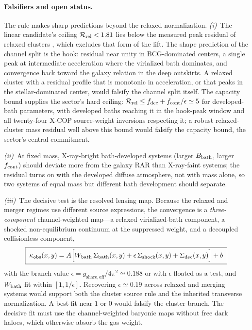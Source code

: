 \documentclass[11pt]{article}
\begin{document}
\paragraph{Falsifiers and open status.}
The rule makes sharp predictions beyond the relaxed normalization. \emph{(i)}~The linear candidate's ceiling $\mathcal R_{\rm rel}<1.81$ lies below the measured peak residual of relaxed clusters \citep{Tian2020,Eckert2022}, which excludes that form of the lift. The shape prediction of the channel split is the hook: residual near unity in BCG-dominated centers, a single peak at intermediate acceleration where the virialized bath dominates, and convergence back toward the galaxy relation in the deep outskirts. A relaxed cluster with a residual profile that is monotonic in acceleration, or that peaks in the stellar-dominated center, would falsify the channel split itself. The capacity bound supplies the sector's hard ceiling: $\mathcal R_{\rm rel}\le f_{\rm dec}+f_{\rm cont}/\epsilon\simeq5$ for developed-bath parameters, with developed baths reaching it in the hook-peak window and all twenty-four X-COP source-weight inversions respecting it; a robust relaxed-cluster mass residual well above this bound would falsify the capacity bound, the sector's central commitment.

\emph{(ii)}~At fixed mass, X-ray-bright bath-developed systems (larger $B_{\rm bath}$, larger $f_{\rm cont}$) should deviate more from the galaxy RAR than X-ray-faint systems; the residual turns on with the developed diffuse atmosphere, not with mass alone, so two systems of equal mass but different bath development should separate.

\emph{(iii)}~The decisive test is the resolved lensing map. Because the relaxed and merger regimes use different source expressions, the convergence is a \emph{three-component} channel-weighted map---a relaxed virialized-bath component, a shocked non-equilibrium continuum at the suppressed weight, and a decoupled collisionless component,
\[
\boxed{\;
\kappa_{\rm obs}(x,y)
=
A\Big[
W_{\rm bath}\,\Sigma_{\rm bath}(x,y)
+\epsilon\,\Sigma_{\rm shock}(x,y)
+\Sigma_{\rm dec}(x,y)
\Big]+b\;}
\]
with the branch value $\epsilon=g_{\mathrm{share,eff}}/4\pi^2\simeq0.188$ or with $\epsilon$ floated as a test, and $W_{\rm bath}$ fit within $[1,1/\epsilon]$. Recovering $\epsilon\simeq0.19$ across relaxed and merging systems would support both the cluster source rule and the inherited transverse normalization. A best fit near $1$ or $0$ would falsify the cluster branch. The decisive fit must use the channel-weighted baryonic maps without free dark haloes, which otherwise absorb the gas weight.
\end{document}
